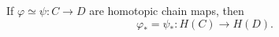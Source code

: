 If $\varphi \simeq \psi : C \to D$ are homotopic chain maps, then
$$\varphi_* = \psi_* : H(C) \to H(D).$$
